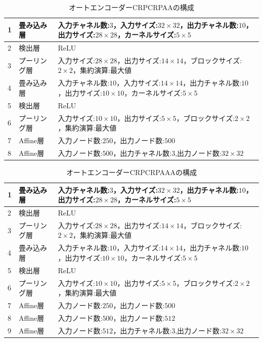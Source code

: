 \documentclass[12pt]{jsarticle}
\begin{document}
\begin{table}[ht]
\begin{center}
  \caption{オートエンコーダーCRPCRPAAの構成}
\label{table:CRPCRPAA}
\begin{tabularx}{0.9\linewidth}{|l|l|X|}
\hline
1 & 畳み込み層 & 入力チャネル数:$3$，入力サイズ:$32 \times 32$，出力チャネル数:$10$，出力サイズ:$28 \times 28$，カーネルサイズ:$5 \times 5$ \\
\hline
2 & 検出層 & ReLU \\
\hline
3 & プーリング層 & 入力サイズ:$28 \times 28$，出力サイズ:$14 \times 14$，ブロックサイズ:$2 \times 2$，集約演算:最大値 \\
\hline
4 & 畳み込み層 & 入力チャネル数:$10$，入力サイズ:$14 \times 14$，出力チャネル数:$10$，出力サイズ:$10 \times 10$，カーネルサイズ:$5 \times 5$ \\
\hline
5 & 検出層 & ReLU \\
\hline
6 & プーリング層 & 入力サイズ:$10 \times 10$，出力サイズ:$5 \times 5$，ブロックサイズ:$2 \times 2$，集約演算:最大値 \\
\hline
7 & Affine層 & 入力ノード数:$250$，出力ノード数:$500$ \\
\hline
8 & Affine層 & 入力ノード数:$500$，出力チャネル数:$3$,出力ノード数:$ 32 \times 32 $ \\
\hline
\end{tabularx}
\end{center}
\end{table}

\begin{table}[ht]
\begin{center}
\caption{オートエンコーダーCRPCRPAAAの構成}
\label{table:CRPCRPAAA}
\begin{tabularx}{0.9\linewidth}{|l|l|X|}
\hline
1 & 畳み込み層 & 入力チャネル数:$3$，入力サイズ:$32 \times 32$，出力チャネル数:$10$，出力サイズ:$28 \times 28$，カーネルサイズ:$5 \times 5$ \\
\hline
2 & 検出層 & ReLU \\
\hline
3 & プーリング層 & 入力サイズ:$28 \times 28$，出力サイズ:$14 \times 14$，ブロックサイズ:$2 \times 2$，集約演算:最大値 \\
\hline
4 & 畳み込み層 & 入力チャネル数:$10$，入力サイズ:$14 \times 14$，出力チャネル数:$10$，出力サイズ:$10 \times 10$，カーネルサイズ:$5 \times 5$ \\
\hline
5 & 検出層 & ReLU \\
\hline
6 & プーリング層 & 入力サイズ:$10 \times 10$，出力サイズ:$5 \times 5$，ブロックサイズ:$2 \times 2$，集約演算:最大値 \\
\hline
7 & Affine層 & 入力ノード数:$250$，出力ノード数:$500$ \\
\hline
8 & Affine層 & 入力ノード数:$500$，出力ノード数:$512$ \\
\hline
9 & Affine層 & 入力ノード数:$512$，出力チャネル数:$3$,出力ノード数:$ 32 \times 32 $ \\
\hline
\end{tabularx}
\end{center}
\end{table}
\end{document}
